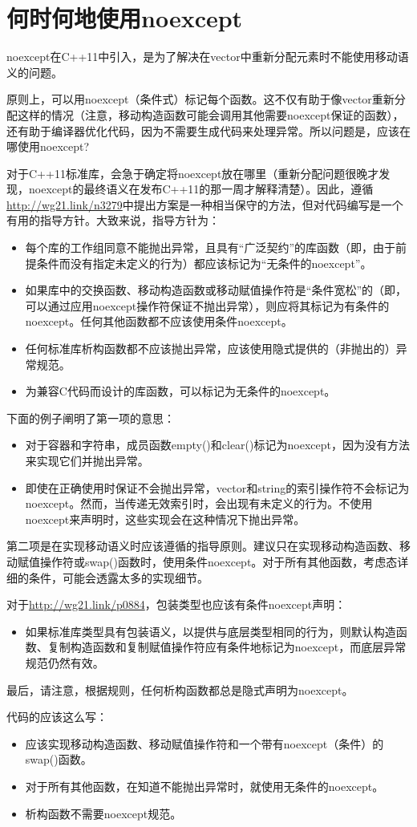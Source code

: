 \section{何时何地使用noexcept}
noexcept在C++11中引入，是为了解决在vector中重新分配元素时不能使用移动语义的问题。

原则上，可以用noexcept（条件式）标记每个函数。这不仅有助于像vector重新分配这样的情况（注意，移动构造函数可能会调用其他需要noexcept保证的函数），还有助于编译器优化代码，因为不需要生成代码来处理异常。所以问题是，应该在哪使用noexcept?

对于C++11标准库，会急于确定将noexcept放在哪里（重新分配问题很晚才发现，noexcept的最终语义在发布C++11的那一周才解释清楚）。因此，遵循\url{http://wg21.link/n3279}中提出方案是一种相当保守的方法，但对代码编写是一个有用的指导方针。大致来说，指导方针为：

\begin{itemize}
	\item 每个库的工作组同意不能抛出异常，且具有“广泛契约”的库函数（即，由于前提条件而没有指定未定义的行为）都应该标记为“无条件的noexcept”。
	\item 如果库中的交换函数、移动构造函数或移动赋值操作符是“条件宽松”的（即，可以通过应用noexcept操作符保证不抛出异常），则应将其标记为有条件的noexcept。任何其他函数都不应该使用条件noexcept。
	\item 任何标准库析构函数都不应该抛出异常，应该使用隐式提供的（非抛出的）异常规范。
	\item 为兼容C代码而设计的库函数，可以标记为无条件的noexcept。
\end{itemize}

下面的例子阐明了第一项的意思：

\begin{itemize}
	\item 对于容器和字符串，成员函数empty()和clear()标记为noexcept，因为没有方法来实现它们并抛出异常。
	\item 即使在正确使用时保证不会抛出异常，vector和string的索引操作符不会标记为noexcept。然而，当传递无效索引时，会出现有未定义的行为。不使用noexcept来声明时，这些实现会在这种情况下抛出异常。
\end{itemize}

第二项是在实现移动语义时应该遵循的指导原则。建议只在实现移动构造函数、移动赋值操作符或swap()函数时，使用条件noexcept。对于所有其他函数，考虑态详细的条件，可能会透露太多的实现细节。

对于\url{http://wg21.link/p0884}，包装类型也应该有条件noexcept声明：

\begin{itemize}
	\item 如果标准库类型具有包装语义，以提供与底层类型相同的行为，则默认构造函数、复制构造函数和复制赋值操作符应有条件地标记为noexcept，而底层异常规范仍然有效。
\end{itemize}

最后，请注意，根据规则，任何析构函数都总是隐式声明为noexcept。

代码的应该这么写：

\begin{itemize}
	\item 应该实现移动构造函数、移动赋值操作符和一个带有noexcept（条件）的swap()函数。
	\item 对于所有其他函数，在知道不能抛出异常时，就使用无条件的noexcept。
	\item 析构函数不需要noexcept规范。
\end{itemize}







